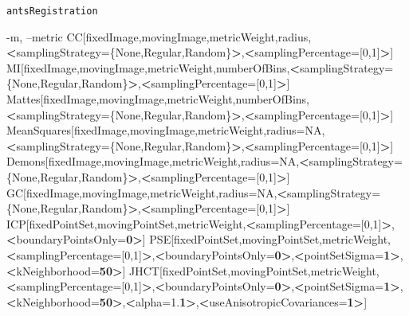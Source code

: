 \documentclass[ignorenonframetext,]{beamer}
\newenvironment{Shaded}{\begin{snugshade}}{\end{snugshade}}
\newcommand{\DataTypeTok}[1]{\textcolor[rgb]{0.13,0.29,0.53}{#1}}
\newcommand{\OperatorTok}[1]{\textcolor[rgb]{0.81,0.36,0.00}{\textbf{#1}}}
\newcommand{\ExtensionTok}[1]{#1}
\newcommand{\NormalTok}[1]{#1}
\begin{document}
\begin{frame}[fragile]{\texttt{antsRegistration}}
\begin{Shaded}
\begin{Highlighting}[]
     \ExtensionTok{-m}\NormalTok{, --metric CC[fixedImage,movingImage,metricWeight,radius,}\OperatorTok{<}\NormalTok{samplingStrategy=}\DataTypeTok{\{None,Regular,Random\}}\OperatorTok{>}\NormalTok{,}\OperatorTok{<}\NormalTok{samplingPercentage=[0,1]}\OperatorTok{>}\NormalTok{]}
                  \ExtensionTok{MI}\NormalTok{[fixedImage,movingImage,metricWeight,numberOfBins,}\OperatorTok{<}\NormalTok{samplingStrategy=}\DataTypeTok{\{None,Regular,Random\}}\OperatorTok{>}\NormalTok{,}\OperatorTok{<}\NormalTok{samplingPercentage=[0,1]}\OperatorTok{>}\NormalTok{]}
                  \ExtensionTok{Mattes}\NormalTok{[fixedImage,movingImage,metricWeight,numberOfBins,}\OperatorTok{<}\NormalTok{samplingStrategy=}\DataTypeTok{\{None,Regular,Random\}}\OperatorTok{>}\NormalTok{,}\OperatorTok{<}\NormalTok{samplingPercentage=[0,1]}\OperatorTok{>}\NormalTok{]}
                  \ExtensionTok{MeanSquares}\NormalTok{[fixedImage,movingImage,metricWeight,radius=NA,}\OperatorTok{<}\NormalTok{samplingStrategy=}\DataTypeTok{\{None,Regular,Random\}}\OperatorTok{>}\NormalTok{,}\OperatorTok{<}\NormalTok{samplingPercentage=[0,1]}\OperatorTok{>}\NormalTok{]}
                  \ExtensionTok{Demons}\NormalTok{[fixedImage,movingImage,metricWeight,radius=NA,}\OperatorTok{<}\NormalTok{samplingStrategy=}\DataTypeTok{\{None,Regular,Random\}}\OperatorTok{>}\NormalTok{,}\OperatorTok{<}\NormalTok{samplingPercentage=[0,1]}\OperatorTok{>}\NormalTok{]}
                  \ExtensionTok{GC}\NormalTok{[fixedImage,movingImage,metricWeight,radius=NA,}\OperatorTok{<}\NormalTok{samplingStrategy=}\DataTypeTok{\{None,Regular,Random\}}\OperatorTok{>}\NormalTok{,}\OperatorTok{<}\NormalTok{samplingPercentage=[0,1]}\OperatorTok{>}\NormalTok{]}
                  \ExtensionTok{ICP}\NormalTok{[fixedPointSet,movingPointSet,metricWeight,}\OperatorTok{<}\NormalTok{samplingPercentage=[0,1]}\OperatorTok{>}\NormalTok{,}\OperatorTok{<}\NormalTok{boundaryPointsOnly=}\OperatorTok{0>}\NormalTok{]}
                  \ExtensionTok{PSE}\NormalTok{[fixedPointSet,movingPointSet,metricWeight,}\OperatorTok{<}\NormalTok{samplingPercentage=[0,1]}\OperatorTok{>}\NormalTok{,}\OperatorTok{<}\NormalTok{boundaryPointsOnly=}\OperatorTok{0>}\NormalTok{,}\OperatorTok{<}\NormalTok{pointSetSigma=}\OperatorTok{1>}\NormalTok{,}\OperatorTok{<}\NormalTok{kNeighborhood=}\OperatorTok{50>}\NormalTok{]}
                  \ExtensionTok{JHCT}\NormalTok{[fixedPointSet,movingPointSet,metricWeight,}\OperatorTok{<}\NormalTok{samplingPercentage=[0,1]}\OperatorTok{>}\NormalTok{,}\OperatorTok{<}\NormalTok{boundaryPointsOnly=}\OperatorTok{0>}\NormalTok{,}\OperatorTok{<}\NormalTok{pointSetSigma=}\OperatorTok{1>}\NormalTok{,}\OperatorTok{<}\NormalTok{kNeighborhood=}\OperatorTok{50>}\NormalTok{,}\OperatorTok{<}\NormalTok{alpha=1.}\OperatorTok{1>}\NormalTok{,}\OperatorTok{<}\NormalTok{useAnisotropicCovariances=}\OperatorTok{1>}\NormalTok{]}

\end{Highlighting}
\end{Shaded}
\end{frame}
\end{document}
